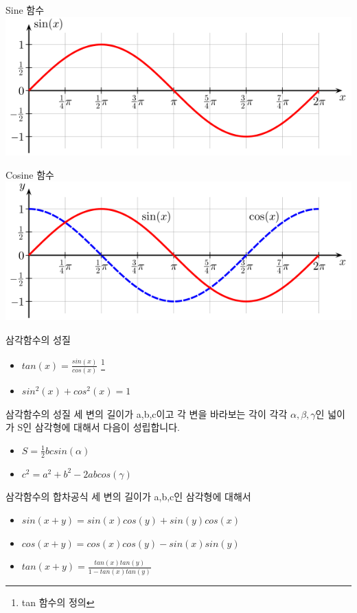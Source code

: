 \documentclass{beamer}
\begin{document}
\begin{frame}{Sine 함수}
\includegraphics[width=\textwidth]{sin}
\end{frame}

\begin{frame}{Cosine 함수}
\includegraphics[width=\textwidth]{cos}
\end{frame}

\begin{frame}{삼각함수의 성질}
\begin{itemize}
\item $tan(x) = \frac{sin(x)}{cos(x)}$ \footnote{tan 함수의 정의}
\item $sin^2(x) + cos^2(x) = 1$
\end{itemize}
\end{frame}

\begin{frame}{삼각함수의 성질}
세 변의 길이가 a,b,c이고 각 변을 바라보는 각이 각각 $\alpha, \beta, \gamma$인 넓이가 S인 삼각형에 대해서 다음이 성립합니다. 
\begin{itemize}
\item $S = \frac{1}{2} bc sin(\alpha)$
\item $c^2 = a^2 + b^2 - 2ab cos(\gamma)$
\end{itemize}
\end{frame}

\begin{frame}{삼각함수의 합차공식}
세 변의 길이가 a,b,c인 삼각형에 대해서 
\begin{itemize}
\item $sin(x+y) = sin(x)cos(y) + sin(y)cos(x)$
\item $cos(x+y) = cos(x)cos(y) - sin(x)sin(y)$
\item $tan(x+y) = \frac{tan(x)tan(y)}{1-tan(x)tan(y)}$
\end{itemize}
\end{frame}
\end{document}
